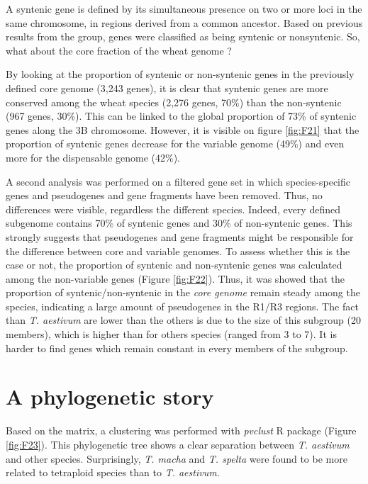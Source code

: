 \documentclass[a4paper, 12pt]{article}
\begin{document}
\begin{onehalfspace}
A syntenic gene is defined by its simultaneous presence on two or more loci in the same chromosome, in regions derived from a common ancestor. Based on previous results from the group, genes were classified as being syntenic or nonsyntenic. So, what about the core fraction of the wheat genome ?

By looking at the proportion of syntenic or non-syntenic genes in the previously defined core genome (3,243 genes), it is clear that syntenic genes are more conserved among the wheat species (2,276 genes, 70\%) than the non-syntenic (967 genes, 30\%). This can be linked to the global proportion of 73\% of syntenic genes along the 3B chromosome. However, it is visible on figure \ref{fig:F21} that the proportion of syntenic genes decrease for the variable genome (49\%) and even more for the dispensable genome (42\%). 

A second analysis was performed on a filtered gene set in which species-specific genes and pseudogenes and gene fragments have been removed. Thus, no differences were visible, regardless the different species. Indeed, every defined subgenome contains 70\% of syntenic genes and 30\% of non-syntenic genes. This strongly suggests that pseudogenes and gene fragments might be responsible for the difference between core and variable genomes. To assess whether this is the case or not, the proportion of syntenic and non-syntenic genes was calculated among the non-variable genes (Figure \ref{fig:F22}). Thus, it was showed that the proportion of syntenic/non-syntenic in the \textit{core genome} remain steady among the species, indicating a large amount of pseudogenes in the R1/R3 regions. The fact than \textit{T. aestivum} are lower than the others is due to the size of this subgroup (20 members), which is higher than for others species (ranged from 3 to 7). It is harder to find genes which remain constant in every members of the subgroup.

    \section{A phylogenetic story}
        
Based on the matrix, a clustering was performed with \textit{pvclust} R package (Figure \ref{fig:F23}). This phylogenetic tree shows a clear separation between \textit{T. aestivum} and other species. Surprisingly, \textit{T. macha} and \textit{T. spelta} were found to be more related to tetraploid species than to \textit{T. aestivum}. 


\end{onehalfspace}
\end{document}
